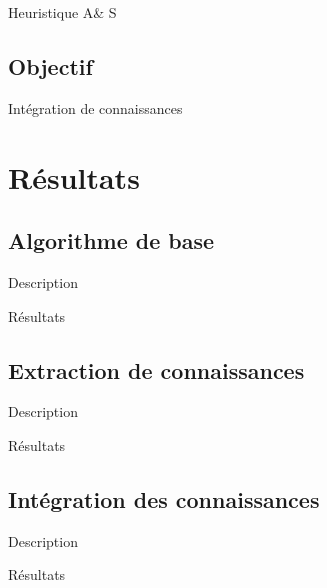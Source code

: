 \documentclass{beamer}
\begin{document}
\begin{frame}{Heuristique A\& S}

\end{frame}

\subsection{Objectif}

\begin{frame}{Intégration de connaissances}

\end{frame}

\section{Résultats}

\subsection{Algorithme de base}

\begin{frame}{Description}

\end{frame}

\begin{frame}{Résultats}

\end{frame}

\subsection{Extraction de connaissances}

\begin{frame}{Description}

\end{frame}

\begin{frame}{Résultats}

\end{frame}

\subsection{Intégration des connaissances}

\begin{frame}{Description}

\end{frame}

\begin{frame}{Résultats}

\end{frame}
\end{document}

